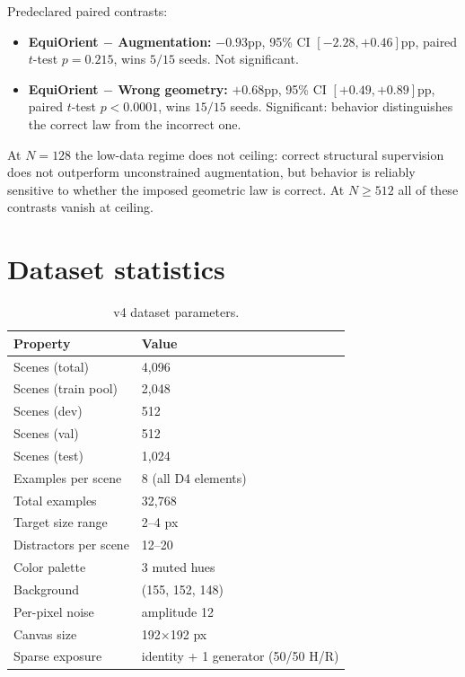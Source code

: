 \documentclass[10pt,letterpaper]{article}
\begin{document}
Predeclared paired contrasts:

\begin{itemize}[leftmargin=*]
\item \textbf{EquiOrient $-$ Augmentation:} $-0.93$pp, 95\% CI
$[-2.28, +0.46]$pp, paired $t$-test $p=0.215$, wins $5/15$ seeds.
Not significant.
\item \textbf{EquiOrient $-$ Wrong geometry:} $+0.68$pp, 95\% CI
$[+0.49, +0.89]$pp, paired $t$-test $p<0.0001$, wins $15/15$ seeds.
Significant: behavior distinguishes the correct law from the
incorrect one.
\end{itemize}

At $N{=}128$ the low-data regime does not ceiling: correct structural
supervision does not outperform unconstrained augmentation, but
behavior is reliably sensitive to whether the imposed geometric law
is correct. At $N \geq 512$ all of these contrasts vanish at ceiling.

\section{Dataset statistics}

\begin{table}[h]
\centering\small
\begin{tabular}{ll}
\toprule
Property & Value \\
\midrule
Scenes (total) & 4,096 \\
Scenes (train pool) & 2,048 \\
Scenes (dev) & 512 \\
Scenes (val) & 512 \\
Scenes (test) & 1,024 \\
Examples per scene & 8 (all D4 elements) \\
Total examples & 32,768 \\
Target size range & 2--4 px \\
Distractors per scene & 12--20 \\
Color palette & 3 muted hues \\
Background & (155, 152, 148) \\
Per-pixel noise & amplitude 12 \\
Canvas size & 192$\times$192 px \\
Sparse exposure & identity + 1 generator (50/50 H/R) \\
\bottomrule
\end{tabular}
\caption{v4 dataset parameters.}
\end{table}
\end{document}
